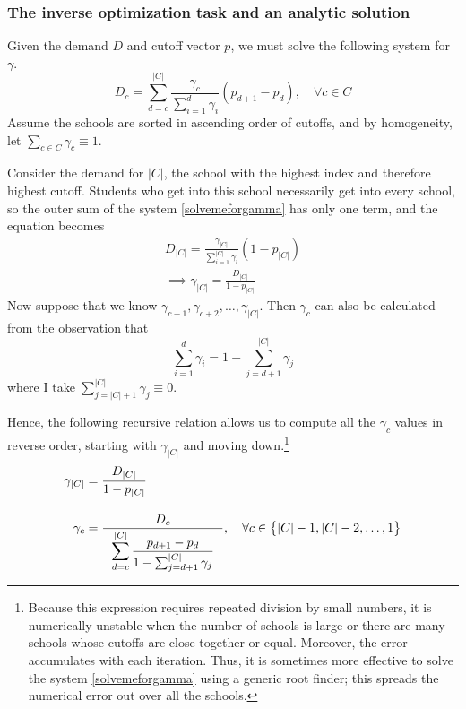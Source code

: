 \documentclass[12pt]{article}
\numberwithin{equation}{subsection}
\theoremstyle{definition}
\begin{document}
\subsubsection{The inverse optimization task and an analytic solution}
Given the demand $D$ and cutoff vector $p$, we must solve the following system for $\gamma$.
\begin{equation}
D_c = \sum_{d=c}^{|C|} 
\frac{\gamma_c}{ \sum_{i=1}^d \gamma_i} 
\left(p_{d+1} - p_{d}\right),
\quad \forall c \in C
 \label{solvemeforgamma}
 \end{equation}
Assume the schools are sorted in ascending order of cutoffs, and by homogeneity, let $\sum_{c \in C} \gamma_c \equiv 1$.

Consider the demand for $|C|$, the school with the highest index and therefore highest cutoff. Students who get into this school necessarily get into every school, so the outer sum of the system \eqref{solvemeforgamma} has only one term, and the equation becomes
\begin{align}D_{|C|} =
\frac{\gamma_{|C|}}{ \sum_{i=1}^{|C|} \gamma_i} 
\left(1 - p_{|C|}\right) \\
\implies \gamma_{|C|} = \frac{D_{|C|}}{1 - p_{|C|}}
\end{align}
Now suppose that we know $\gamma_{c+1}, \gamma_{c+2}, \dots, \gamma_{|C|}$. Then $\gamma_c$ can also be calculated from the observation that
\[\sum_{i=1}^d \gamma_i = 1 - \sum_{j=d+1}^{|C|} \gamma_j\]
where I take $\sum_{j=|C|+1}^{|C|} \gamma_j \equiv 0$.

Hence, the following recursive relation allows us to compute all the $\gamma_c$ values in reverse order, starting with $\gamma_{|C|}$ and moving down.\footnote{Because this expression requires repeated division by small numbers, it is numerically unstable when the number of schools is large or there are many schools whose cutoffs are close together or equal. Moreover, the error accumulates with each iteration. Thus, it is sometimes more effective to solve the system \eqref{solvemeforgamma} using a generic root finder; this spreads the numerical error out over all the schools.} 
\begin{align}
\gamma_{|C|} &= \frac{D_{|C|}}{1 - p_{|C|}} \\[1em]
\gamma_c &= \frac{D_c}{~~\mathlarger{\sum_{d=c}^{|C|} \frac{p_{d+1} - p_d}{1 - \sum_{j=d+1}^{|C|} \gamma_j} ~~}}, \quad \forall c \in \bigl\{ |C|-1, |C|-2, \dots, 1\bigr\} \label{gammarecursion}
\end{align}
\end{document}
